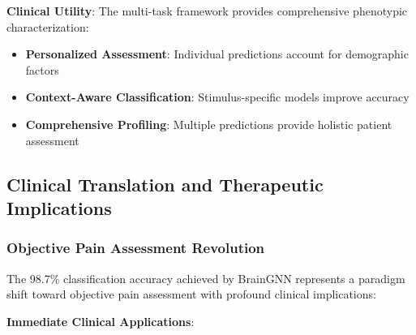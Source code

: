 \documentclass[10pt,journal,compsoc]{IEEEtran}
\begin{document}
\textbf{Clinical Utility}:
The multi-task framework provides comprehensive phenotypic characterization:

\begin{itemize}
\item \textbf{Personalized Assessment}: Individual predictions account for demographic factors
\item \textbf{Context-Aware Classification}: Stimulus-specific models improve accuracy
\item \textbf{Comprehensive Profiling}: Multiple predictions provide holistic patient assessment
\end{itemize}

\subsection{Clinical Translation and Therapeutic Implications}

\subsubsection{Objective Pain Assessment Revolution}

The 98.7\% classification accuracy achieved by BrainGNN represents a paradigm shift toward objective pain assessment with profound clinical implications:

\textbf{Immediate Clinical Applications}:
\end{document}
